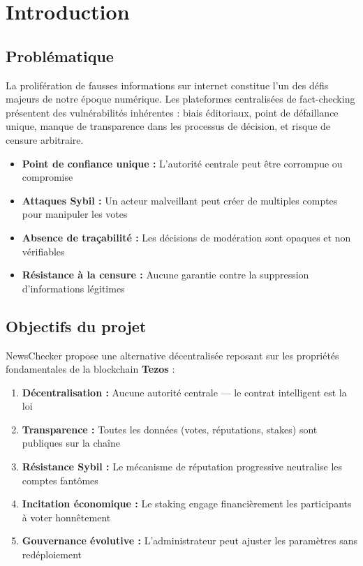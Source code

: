 \documentclass[12pt,a4paper]{article}
\newenvironment{successbox}[1][Résultat]{%
  \begin{tcolorbox}[
    enhanced, breakable,
    colback=success!8, colframe=success!70, coltitle=white,
    title=\textbf{#1}, fonttitle=\small,
    arc=4pt, boxrule=0.8pt,
    left=6pt, right=6pt, top=5pt, bottom=5pt
  ]
}{\end{tcolorbox}}
\newenvironment{dangerbox}[1][Important]{%
  \begin{tcolorbox}[
    enhanced, breakable,
    colback=danger!8, colframe=danger!70, coltitle=white,
    title=\textbf{#1}, fonttitle=\small,
    arc=4pt, boxrule=0.8pt,
    left=6pt, right=6pt, top=5pt, bottom=5pt
  ]
}{\end{tcolorbox}}
\newcommand{\tezos}{\textcolor{primary}{\textbf{Tezos}}}
\begin{document}
\newpage
\tableofcontents
\newpage

\section{Introduction}

\subsection{Problématique}

La prolifération de fausses informations sur internet constitue l'un des défis majeurs de notre époque numérique. Les plateformes centralisées de fact-checking présentent des vulnérabilités inhérentes : biais éditoriaux, point de défaillance unique, manque de transparence dans les processus de décision, et risque de censure arbitraire.

\begin{dangerbox}[Problèmes des systèmes centralisés]
\begin{itemize}
  \item \textbf{Point de confiance unique :} L'autorité centrale peut être corrompue ou compromise
  \item \textbf{Attaques Sybil :} Un acteur malveillant peut créer de multiples comptes pour manipuler les votes
  \item \textbf{Absence de traçabilité :} Les décisions de modération sont opaques et non vérifiables
  \item \textbf{Résistance à la censure :} Aucune garantie contre la suppression d'informations légitimes
\end{itemize}
\end{dangerbox}

\subsection{Objectifs du projet}

NewsChecker propose une alternative décentralisée reposant sur les propriétés fondamentales de la blockchain \tezos{} :

\begin{successbox}[Objectifs principaux]
\begin{enumerate}
  \item \textbf{Décentralisation :} Aucune autorité centrale --- le contrat intelligent est la loi
  \item \textbf{Transparence :} Toutes les données (votes, réputations, stakes) sont publiques sur la chaîne
  \item \textbf{Résistance Sybil :} Le mécanisme de réputation progressive neutralise les comptes fantômes
  \item \textbf{Incitation économique :} Le staking engage financièrement les participants à voter honnêtement
  \item \textbf{Gouvernance évolutive :} L'administrateur peut ajuster les paramètres sans redéploiement
\end{enumerate}
\end{successbox}
\end{document}
